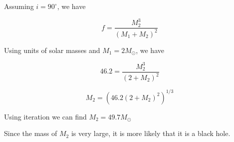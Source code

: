 \documentclass[11pt]{article}
\begin{document}
\begin{pproblem}
\begin{pssolution*}{}{}
\begin{alternativas}
            \item Assuming $i = 90^\circ$, we have
            
            $$f = \frac{M_2^3}{(M_1+M_2)^2}$$

            Using units of solar masses and $M_1 = 2M_\odot$, we have

            $$46.2 = \frac{M_2^3}{(2+M_2)^2}$$

            $$M_2 = \left(46.2 (2+M_2)^2\right)^{1/3}$$

            Using iteration we can find $\boxed{M_2 = 49.7 M_\odot }$

            \item Since the mass of \(M_2\) is very large, it is more likely that it is a black hole.
        \end{alternativas}
    \end{pssolution*}
\end{pproblem}
\end{document}
